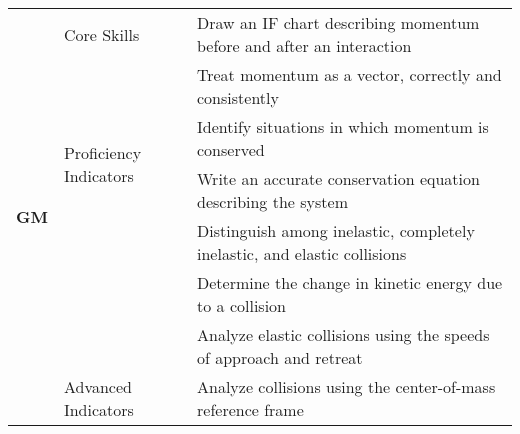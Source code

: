 \centering
{\footnotesize \begin{tabular}{| p{.35 cm} | p{1.7 cm} | p{14.3 cm} | }
\hline
\multirow{8}{*}{\begin{sideways}\parbox{4mm}{{\large{\bf GM}}}\end{sideways}}  &Core Skills 		& Draw an IF chart describing momentum before and after an interaction  \\ \cline{3-3}
& 					& Treat momentum as a vector, correctly and consistently  \\ \cline{2-3}					
& \multirow{2}{*}{\parbox{1.7cm}{Proficiency Indicators}}	& Identify situations in which momentum is conserved \\ \cline{3-3}
&					& Write an accurate conservation equation describing the system \\ \cline{3-3}
& 					& Distinguish among inelastic, completely inelastic, and elastic collisions \\ \cline{3-3}
& 					& Determine the change in kinetic energy due to a collision \\ \cline{3-3}
&					& Analyze elastic collisions using the speeds of approach and retreat \\ \cline{2-3}
& Advanced Indicators	& Analyze collisions using the center-of-mass reference frame \\ \hline
\end{tabular} }
\vspace{2 mm}

